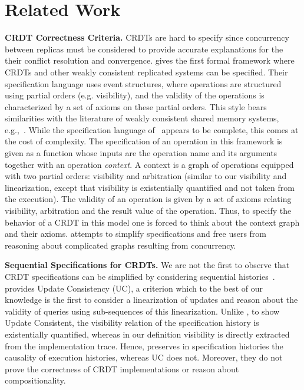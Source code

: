 \section{Related Work}
\label{sec:rel-work}

\noindent
{\bf CRDT Correctness Criteria.}
CRDTs are hard to specify since concurrency between
replicas must be considered to provide accurate explanations for the
their conflict resolution and convergence.
%
\citet{BurckhardtGYZ14, Burckhardt14} gives the first formal framework
where CRDTs and other weakly consistent replicated systems can be
specified.
%
Their specification language uses event structures, where operations
are structured using partial orders (e.g. visibility), and
the validity of the operations is characterized by a set of
axioms on these partial orders.
%
This style bears similarities with the literature of weakly consistent
shared memory systems, e.g.,~\cite{AlglaveMT14}.
%
While the specification language
of~\cite{BurckhardtGYZ14,Burckhardt14} appears to be complete, this
comes at the cost of complexity.
%
The specification of an operation in this framework is given as a
function whose inputs are the operation name and its arguments
together with an operation \emph{context}.
%
A context is a graph of operations equipped with two partial orders:
visibility and arbitration (similar to our visibility and linearization,
except that visibility is existentially quantified and not taken from
the execution).
%
%
The validity of an operation is given by a set of axioms relating
visibility, arbitration and the result value of the operation.
%
Thus, to specify the behavior of a CRDT in this model one is
forced to think about the context graph and their axioms.
%
\CRDTLinshort{} attempts to simplify specifications and
free users from reasoning about complicated graphs resulting from
concurrency.

\smallskip
\noindent
{\bf Sequential Specifications for CRDTs.}
We are not the first to observe that CRDT specifications can be
simplified by considering sequential histories~\cite{PerrinMJ14,
  JagadeesanR18}.
%
\citet{PerrinMJ14} provides Update Consistency (UC), a criterion which to
the best of our knowledge is the first to consider a linearization of
updates and reason about the validity of queries using sub-sequences
of this linearization.
%
Unlike \CRDTLinshort{}, to show Update Consistent, the visibility
relation of the specification history is existentially quantified,
whereas in our definition visibility is directly extracted from the
implementation trace.
%
Hence, \CRDTLinshort{} preserves in specification histories the
causality of execution histories, whereas UC does not.
%
Moreover, they do not prove the
correctness of CRDT implementations or reason about compositionality.

